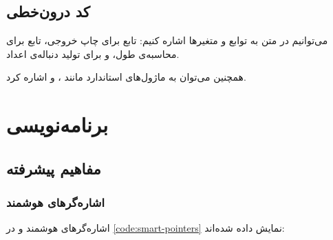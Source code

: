 \documentclass{matinbook}
\begin{document}
\section{کد درون‌خطی}
\label{sec:python-inline}

می‌توانیم در متن به توابع و متغیرها اشاره کنیم:
تابع  برای چاپ خروجی، تابع 
برای محاسبه‌ی طول، و  برای تولید
دنباله‌ی اعداد.

همچنین می‌توان به ماژول‌های استاندارد مانند
،  و
 اشاره کرد.

\chapter{برنامه‌نویسی }
\label{chap:cpp}

\section{مفاهیم پیشرفته}
\label{sec:cpp-advanced}

\subsection{اشاره‌گرهای هوشمند}
\label{sec:cpp-smart-pointers}

اشاره‌گرهای هوشمند و  در \cref{code:smart-pointers}
نمایش داده شده‌اند:
\end{document}
